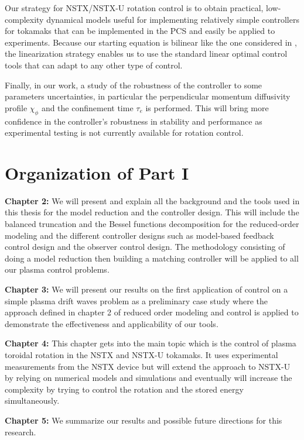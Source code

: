 \documentclass[12pt,lot, lof]{puthesis}
\begin{document}
Our strategy for NSTX/NSTX-U rotation control is to obtain practical, low-complexity dynamical models useful for implementing relatively simple controllers for tokamaks that can be implemented in the PCS and easily be applied to experiments. Because our starting equation is bilinear like the one considered in \cite{Xu11}, the linearization strategy enables us to use the standard linear optimal control tools that can adapt to any other type of control.

Finally, in our work, a study of the robustness of the controller to some parameters uncertainties, in particular the perpendicular momentum diffusivity profile $\chi_{\phi}$ and the confinement time $\tau_e$  is performed. This will bring more confidence in the controller's robustness in stability and performance as experimental testing is not currently available for rotation control.

\section{Organization of Part I}

\textbf{Chapter 2:} We will present and explain all the background and the tools used in this thesis for the model reduction and the controller design. This will include the balanced truncation and the Bessel functions decomposition for the reduced-order modeling and the different controller designs such as model-based feedback control design and the observer control design. The methodology consisting of doing a model reduction then building a matching controller will be applied to all our plasma control problems.

\textbf{Chapter 3:} We will present our results on the first application of control on a simple plasma drift waves problem as a preliminary case study where the approach defined in chapter 2 of reduced order modeling and control is applied to demonstrate the effectiveness and applicability of our tools.

\textbf{Chapter 4:} This chapter gets into the main topic which is the control of plasma toroidal rotation in the NSTX and NSTX-U tokamaks.
It uses experimental measurements from the NSTX device but will extend the approach to NSTX-U by relying on numerical models and  simulations and eventually will increase the complexity by trying to control the rotation and the stored energy simultaneously.

\textbf{Chapter 5:} We summarize our results and possible future directions for this research.
\end{document}
